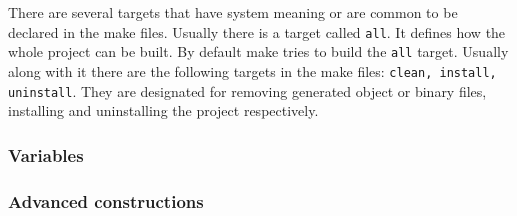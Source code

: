 There are several targets that have system meaning or are common to be declared in the make files. Usually there is a target called {\tt all}. It defines how the whole project can be built. By default make tries to build the {\tt all} target. Usually along with it there are the following targets in the make files: {\tt clean, install, uninstall}. They are designated for removing generated object or binary files, installing and uninstalling the project respectively.
	
	\subsubsection{Variables}
	
	\subsubsection{Advanced constructions}

